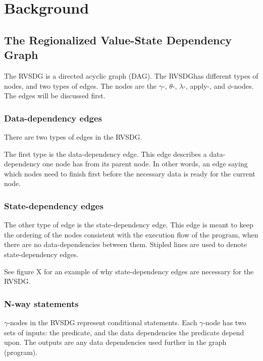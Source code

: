 
\section{Background}
\label{background}

\subsection{The Regionalized Value-State Dependency Graph}
\label{background:RVSDG}

The RVSDG is a directed acyclic graph (DAG). The RVSDGhas different types of
nodes, and two types of edges. The nodes are the $\gamma$-, $\theta$-,
$\lambda$-, apply-, and $\phi$-nodes. The edges will be discussed first.

\subsubsection{Data-dependency edges}

There are two types of edges in the RVSDG.

The first type is the data-dependency edge. This edge describes a data-
dependency one node has from its parent node. In other words, an edge saying
which nodes need to finish first before the necessary data is ready for the
current node.

\subsubsection{State-dependency edges}

The other type of edge is the state-dependency edge. This edge is meant to keep
the ordering of the nodes consistent with the execution flow of the program,
when there are no data-dependencies between them. Stipled lines are used to denote state-dependency edges.

See figure X for an example of why state-dependency edges are necessary for the
RVSDG.

\subsubsection{N-way statements}

\textit{$\gamma$}-nodes in the RVSDG represent conditional statements. Each
$\gamma$-node has two sets of inputs: the predicate, and the data dependencies
the predicate depend upon. The outputs are any data dependencies used further in
the graph (program).

